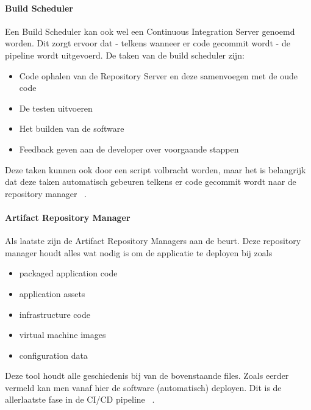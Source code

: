 \paragraph{Build Scheduler}
Een Build Scheduler kan ook wel een Continuous Integration Server genoemd worden.
Dit zorgt ervoor dat - telkens wanneer er code gecommit wordt - de pipeline wordt uitgevoerd. De taken van de build scheduler zijn: 
\begin{itemize}
    \item Code ophalen van de Repository Server en deze samenvoegen met de oude code
    \item De testen uitvoeren
    \item Het builden van de software
    \item Feedback geven aan de developer over voorgaande stappen
\end{itemize}
Deze taken kunnen ook door een script volbracht worden, maar het is belangrijk dat deze taken automatisch gebeuren telkens er code gecommit wordt naar de repository manager ~\autocite{Riti2018}.

\paragraph{Artifact Repository Manager}
Als laatste zijn de Artifact Repository Managers aan de beurt. Deze repository manager houdt alles wat nodig is om de applicatie te deployen bij zoals
\begin{itemize}
    \item packaged application code
    \item application assets
    \item infrastructure code
    \item virtual machine images
    \item configuration data
\end{itemize}
Deze tool houdt alle geschiedenis bij van de bovenstaande files. Zoals eerder vermeld kan men vanaf hier de software (automatisch) deployen. Dit is de allerlaatste fase in de CI/CD pipeline ~\autocite{Skelton2014}.
